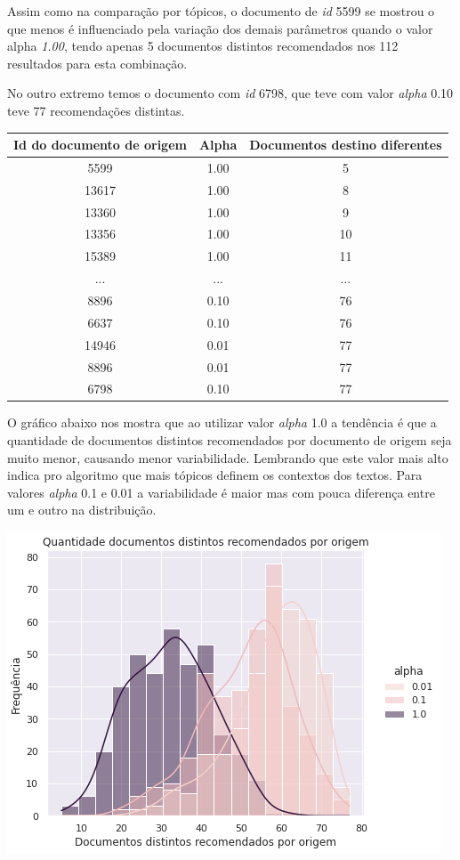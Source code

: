 Assim como na comparação por tópicos, o documento de \textit{id} 5599 se mostrou o que menos é influenciado pela variação dos demais 
parâmetros quando o valor alpha \textit{1.00}, tendo apenas 5 documentos distintos recomendados nos 112 resultados para esta combinação.

No outro extremo temos o documento com \textit{id} 6798, que teve com valor \textit{alpha} 0.10 teve 77 recomendações distintas.

\begin{center}
    \begin{tabular}{|c|c|c|}
        \hline
        \textbf{Id do documento de origem} & \textbf{Alpha} & \textbf{Documentos destino diferentes} \\
        \hline
        5599 & 1.00 & 5 \\
        \hline
        13617 & 1.00 & 8 \\
        \hline
        13360 & 1.00 & 9 \\
        \hline
        13356 & 1.00 & 10 \\
        \hline
        15389 & 1.00 & 11 \\
        \hline
        ... & ... & ... \\
        \hline
        8896 & 0.10 & 76 \\
        \hline
        6637 & 0.10 & 76 \\
        \hline
        14946 & 0.01 & 77 \\
        \hline
        8896 & 0.01 & 77 \\
        \hline
        6798 & 0.10 & 77 \\
        \hline
    \end{tabular}
\end{center}

O gráfico abaixo nos mostra que ao utilizar valor \textit{alpha} 1.0 a tendência é que a quantidade de documentos distintos recomendados por 
documento de origem seja muito menor, causando menor variabilidade. Lembrando que este valor mais alto indica pro algoritmo que mais tópicos definem 
os contextos dos textos. Para valores \textit{alpha} 0.1 e 0.01 a variabilidade é maior mas com pouca diferença entre um e outro na distribuição.

\includegraphics[scale=0.7]{resultados/resources/distribuicao_semelhantes_distintos_alpha.png}

